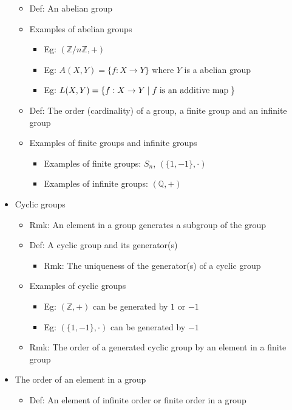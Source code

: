 \documentclass[onecolumn]{ctexart}
\newcommand*\textinmath[1]{\thickspace\textnormal{#1}\thickspace}
\begin{document}
\begin{itemize}
\begin{itemize}
    \item Def: An abelian group
    \item Examples of abelian groups
    \begin{itemize}
      \item Eg: $(\mathbb{Z} \slash n\mathbb{Z}, +)$
      \item Eg: $A(X, Y) = \lbrace f: X \to Y \rbrace$ where $Y$ is a abelian group
      \item Eg: $L(X, Y) = \lbrace f: X \to Y \mid f \textinmath{is an additive map} \rbrace$
    \end{itemize}
    \item Def: The order (cardinality) of a group, a finite group and an infinite group
    \item Examples of finite groups and infinite groups
    \begin{itemize}
      \item Examples of finite groups: $S_n$, $(\lbrace 1, -1 \rbrace, \cdot)$
      \item Examples of infinite groups: $(\mathbb{Q}, +)$
    \end{itemize}
  \end{itemize}
  \item Cyclic groups
  \begin{itemize}
    \item Rmk: An element in a group generates a subgroup of the group
    \item Def: A cyclic group and its generator(s)
    \begin{itemize}
      \item Rmk: The uniqueness of the generator(s) of a cyclic group
    \end{itemize}
    \item Examples of cyclic groups
    \begin{itemize}
      \item Eg: $(\mathbb{Z}, +)$ can be generated by $1$ or $-1$
      \item Eg: $(\lbrace 1, -1 \rbrace, \cdot)$ can be generated by $-1$
    \end{itemize}
    \item Rmk: The order of a generated cyclic group by an element in a finite group
  \end{itemize}
  \item The order of an element in a group
  \begin{itemize}
    \item Def: An element of infinite order or finite order in a group

\end{itemize}
\end{itemize}
\end{document}
